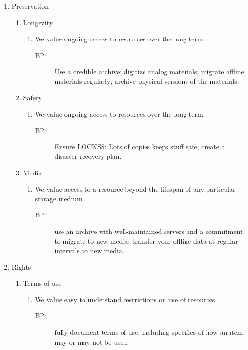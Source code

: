 \documentclass{article}
\begin{document}
\begin{enumerate}
  \item Preservation
  \begin{enumerate}
    \item Longevity
    \begin{enumerate}
      \item We value ongoing access to resources over the long term.
      \begin{description}
      \item[BP:]  Use a credible archive; digitize analog materials; migrate offline materials regularly; archive physical versions of the materials.
      \end{description}
    \end{enumerate}
    \item Safety
    \begin{enumerate}
      \item We value ongoing access to resources over the long term.
      \begin{description}
        \item[BP:]  Ensure LOCKSS: Lots of copies keeps stuff safe; create a disaster recovery plan. 
      \end{description}
    \end{enumerate}
    \item Media
    \begin{enumerate}
      \item We value access to a resource beyond the lifespan of any particular storage medium.
      \begin{description}
        \item[BP:]  use an archive with well-maintained servers and a commitment to migrate to new media; transfer your offline data at regular intervals to new media.
      \end{description}
    \end{enumerate}
  \end{enumerate}
  \item Rights
  \begin{enumerate}
    \item Terms of use
    \begin{enumerate}
      \item We value easy to understand restrictions on use of resources.
      \begin{description}
        \item[BP:]  fully document terms of use, including specifics of how an item may or may not be used.
      \end{description}

\end{enumerate}
\end{enumerate}
\end{enumerate}
\end{document}
